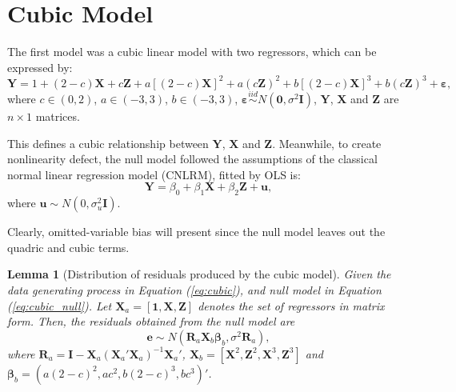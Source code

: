 \documentclass{monashthesis}
\newtheorem{lemma}{Lemma}[chapter]
\theoremstyle{definition}
\theoremstyle{definition}
\theoremstyle{definition}
\theoremstyle{definition}
\theoremstyle{remark}
\begin{document}
\hypertarget{cubic-model}{%
\section{Cubic Model}\label{cubic-model}}

The first model was a cubic linear model with two regressors, which can be expressed by:
\begin{equation} \label{eq:cubic}
\boldsymbol{Y}= 1 + (2-c)\boldsymbol{X} + c\boldsymbol{Z} + a[(2-c)\boldsymbol{X}]^2+a(c\boldsymbol{Z})^2+b[(2-c)\boldsymbol{X}]^3+b(c\boldsymbol{Z})^3+\boldsymbol{\varepsilon},
\end{equation}
where \(c \in (0,2)\), \(a \in (-3,3)\), \(b \in (-3,3)\), \(\boldsymbol{\varepsilon}\overset{iid}{\sim} N(\boldsymbol{0},\sigma^2\boldsymbol{I})\), \(\boldsymbol{Y}\), \(\boldsymbol{X}\) and \(\boldsymbol{Z}\) are \(n\times1\) matrices.

This defines a cubic relationship between \(\boldsymbol{Y}\), \(\boldsymbol{X}\) and \(\boldsymbol{Z}\). Meanwhile, to create nonlinearity defect, the null model followed the assumptions of the classical normal linear regression model (CNLRM), fitted by OLS is:
\begin{equation} \label{eq:cubic_null}
\boldsymbol{Y}=\beta_0+\beta_1\boldsymbol{X}+\beta_2\boldsymbol{Z}+\boldsymbol{u},
\end{equation}
where \(\boldsymbol{u} \sim N(0,\sigma^2_u\boldsymbol{I})\).

Clearly, omitted-variable bias will present since the null model leaves out the quadric and cubic terms.

\begin{lemma}[Distribution of residuals produced by the cubic model] \label{lemma:cubic}
Given the data generating process in Equation (\ref{eq:cubic}), and null model in Equation (\ref{eq:cubic_null}). Let $\boldsymbol{X}_a=[\boldsymbol{1},\boldsymbol{X},\boldsymbol{Z}]$ denotes the set of regressors in matrix form. Then, the residuals obtained from the null model are $$\boldsymbol{e} \sim N(\boldsymbol{R}_a\boldsymbol{X}_b\boldsymbol{\beta}_b, \sigma^2\boldsymbol{R}_a),$$ where $\boldsymbol{R}_a=\boldsymbol{I}-\boldsymbol{X}_a(\boldsymbol{X}_a'\boldsymbol{X}_a)^{-1}\boldsymbol{X}_a'$, $\boldsymbol{X}_b=[\boldsymbol{X}^2,\boldsymbol{Z}^2,\boldsymbol{X}^3,\boldsymbol{Z}^3]$ and $\boldsymbol{\beta}_b=(a(2-c)^2,ac^2,b(2-c)^3,bc^3)'$.
\end{lemma}
\end{document}

